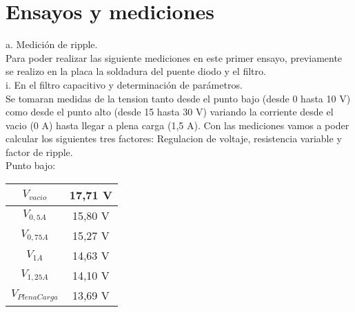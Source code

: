 \chapter{Ensayos y mediciones}

a. Medición de ripple.\\

  Para poder realizar las siguiente mediciones en este primer ensayo, previamente se realizo en la placa la soldadura del puente diodo y el filtro.\\

i. En el filtro capacitivo y determinación de parámetros.\\

  Se tomaran medidas de la tension tanto desde el punto bajo (desde 0 hasta 10 V) como desde el punto alto (desde 15 hasta 30 V) variando la corriente desde el vacio (0 A) hasta llegar a plena carga (1,5 A). Con las mediciones vamos a poder calcular los siguientes tres factores: Regulacion de voltaje, resistencia variable y factor de ripple.\\

Punto bajo:

\begin{tabular}{|c|c|}
  \hline
  $V_{vacio}$ & 17,71 V \\ \hline
  $V_{0,5 A}$ & 15,80 V \\ \hline
  $V_{0,75 A}$ & 15,27 V \\ \hline    
  $V_{1 A}$ & 14,63 V \\ \hline
  $V_{1,25 A}$ & 14,10 V \\ \hline
  $V_{PlenaCarga}$ & 13,69 V \\ \hline
\end{tabular} \\


\begin{figure}[H]
\end{figure}


